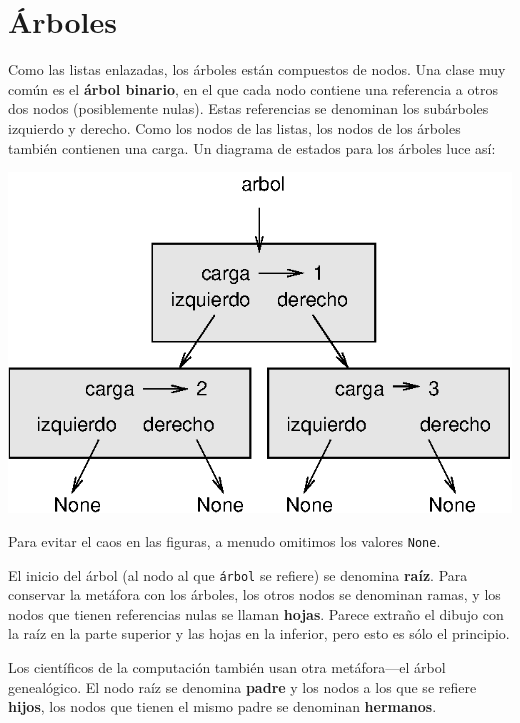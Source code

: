 
\chapter{Árboles}

   
 

Como las listas enlazadas, los árboles están compuestos de nodos.
Una clase muy común es el \textbf{árbol binario}, en el que cada nodo
contiene una referencia a otros dos nodos (posiblemente nulas). Estas
referencias se denominan los subárboles izquierdo y derecho. Como
los nodos de las listas, los nodos de los árboles también contienen
una carga. Un diagrama de estados para los árboles luce así:

\label{tree} \beforefig \centerline{\includegraphics{illustrations/tree1}}
\afterfig

Para evitar el caos en las figuras, a menudo omitimos los valores
\texttt{None}.

El inicio del árbol (al nodo al que \texttt{árbol} se refiere) se
denomina \textbf{raíz}. Para conservar la metáfora con los árboles,
los otros nodos se denominan ramas, y los nodos que tienen referencias
nulas se llaman \textbf{hojas}. Parece extraño el dibujo con la raíz
en la parte superior y las hojas en la inferior, pero esto es sólo
el principio.

   

Los científicos de la computación también usan otra metáfora—el árbol
genealógico. El nodo raíz se denomina \textbf{padre} y los nodos a
los que se refiere \textbf{hijos}, los nodos que tienen el mismo padre
se denominan \textbf{hermanos}.

